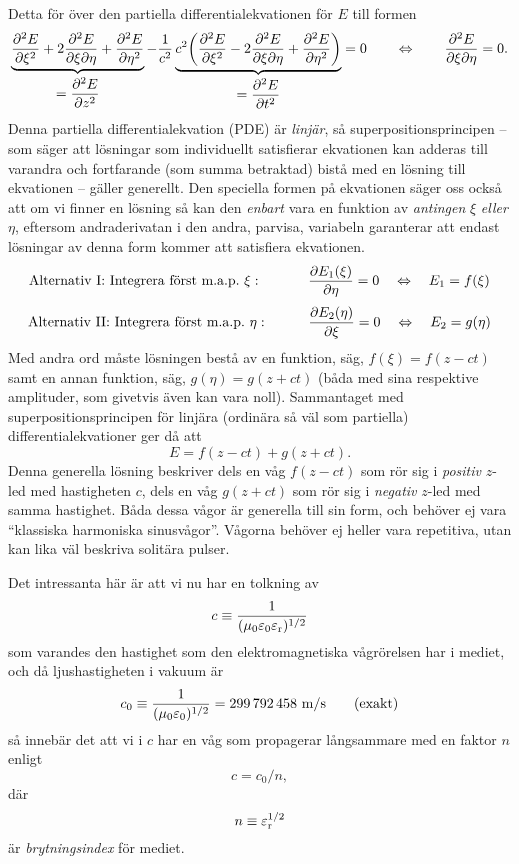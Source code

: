 Detta f{\"o}r {\"o}ver den partiella differentialekvationen f{\"o}r $E$ till
formen
$$
  \underbrace{
  {{\partial^2 E}\over{\partial\xi^2}}
     +2{{\partial^2 E}\over{\partial\xi\partial\eta}}
     +{{\partial^2 E}\over{\partial\eta^2}}
     }_{\displaystyle={{\partial^2E}\over{\partial z^2}}}
   -{{1}\over{c^2}}
  \underbrace{
     c^2\bigg({{\partial^2 E}\over{\partial\xi^2}}
     -2{{\partial^2 E}\over{\partial\xi\partial\eta}}
     +{{\partial^2 E}\over{\partial\eta^2}}\bigg)
     }_{\displaystyle={{\partial^2E}\over{\partial t^2}}} = 0
  \qquad\Leftrightarrow\qquad
  {{\partial^2 E}\over{\partial\xi\partial\eta}} = 0.
$$
\vfill\eject
\noindent
Denna partiella differentialekvation (PDE) {\"a}r {\it linj{\"a}r}, s{\aa}
superpositionsprincipen -- som s{\"a}ger att l{\"o}sningar som individuellt
satisfierar ekvationen kan adderas till varandra och fortfarande (som summa
betraktad) bist{\aa} med en l{\"o}sning till ekvationen -- g{\"a}ller generellt.
Den speciella formen p{\aa} ekvationen s{\"a}ger oss ocks{\aa} att om vi finner
en l{\"o}sning s{\aa} kan den {\it enbart} vara en funktion av {\it antingen}
$\xi$ {\it eller} $\eta$, eftersom andraderivatan i den andra, parvisa,
variabeln garanterar att endast l{\"o}sningar av denna form kommer att
satisfiera ekvationen.
$$
  \hbox{Alternativ I: Integrera f{\"o}rst m.a.p.}\ \xi:
  \hbox{\hphantom{II}\hphantom{$\eta$}}
  \qquad{{\partial E_1(\xi)}\over{\partial\eta}}=0
  \quad\Leftrightarrow\quad E_1=f(\xi)
$$
$$
  \hbox{Alternativ II: Integrera f{\"o}rst m.a.p.}\ \eta:
  \hbox{\hphantom{I}\hphantom{$\xi$}}
  \qquad{{\partial E_2(\eta)}\over{\partial\xi}}=0
  \quad\Leftrightarrow\quad E_2=g(\eta)
$$
Med andra ord m{\aa}ste l{\"o}sningen best{\aa} av en funktion, s{\"a}g,
$f(\xi)=f(z-ct)$ samt en annan funktion, s{\"a}g, $g(\eta)=g(z+ct)$ (b{\aa}da
med sina respektive amplituder, som givetvis {\"a}ven kan vara noll).
Sammantaget med superpositionsprincipen f{\"o}r linj{\"a}ra (ordin{\"a}ra
s{\aa} v{\"a}l som partiella) differentialekvationer ger d{\aa} att
$$
  E = f(z-ct) + g(z+ct).
$$
Denna generella l{\"o}sning beskriver dels en v{\aa}g $f(z-ct)$ som r{\"o}r sig
i {\it positiv} $z$-led med hastigheten $c$, dels en v{\aa}g $g(z+ct)$ som
r{\"o}r sig i {\it negativ} $z$-led med samma hastighet. B{\aa}da dessa
v{\aa}gor {\"a}r generella till sin form, och beh{\"o}ver ej vara ``klassiska
harmoniska sinusv{\aa}gor''. V{\aa}gorna beh{\"o}ver ej heller vara repetitiva,
utan kan lika v{\"a}l beskriva solit{\"a}ra pulser.

Det intressanta h{\"a}r {\"a}r att vi nu har en tolkning av
$$
  c \equiv {{1}\over{(\mu_0\varepsilon_0\varepsilon_{\rm r})^{1/2}}}
$$
som varandes den hastighet som den elektromagnetiska v{\aa}gr{\"o}relsen har i
mediet, och d{\aa} ljus\-hastig\-heten i vakuum {\"a}r
$$
  c_0 \equiv {{1}\over{(\mu_0\varepsilon_0)^{1/2}}}
      = 299\,792\,458\ {\rm m}/{\rm s}\qquad(\hbox{exakt})
$$
s{\aa} inneb{\"a}r det att vi i $c$ har en v{\aa}g som propagerar
l{\aa}ngsammare med en faktor $n$ enligt
$$
  c = c_0/n,
$$
d{\"a}r
$$
  n \equiv\varepsilon^{1/2}_{\rm r}
$$
{\"a}r {\it brytningsindex} f{\"o}r mediet.

